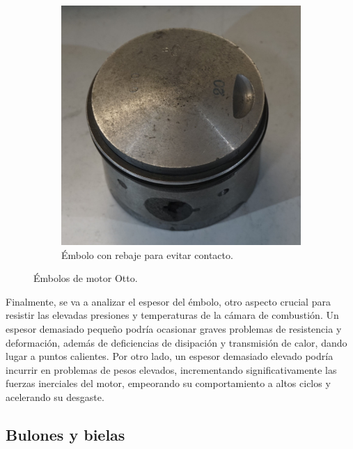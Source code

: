 \begin{figure}[H]
\begin{subfigure}[b]{0.45\textwidth}
 		\includegraphics[width=\linewidth]{Figures/01/m1/cil_gas_2.jpg}
 		\caption{Émbolo con rebaje para evitar contacto.}
		\label{fig:emb_gas_2}
	\end{subfigure}    
	\caption{Émbolos de motor Otto.}
	\label{fig:emb_gas}
\end{figure}


Finalmente, se va a analizar el espesor del émbolo, otro aspecto crucial para resistir las elevadas presiones y temperaturas de la cámara de combustión. Un espesor demasiado pequeño podría ocasionar graves problemas de resistencia y deformación, además de deficiencias de disipación y transmisión de calor, dando lugar a puntos calientes. Por otro lado, un espesor demasiado elevado podría incurrir en problemas de pesos elevados, incrementando significativamente las fuerzas inerciales del motor, empeorando su comportamiento a altos ciclos y acelerando su desgaste.

\subsection{Bulones y bielas} \label{ss:wristpins}

